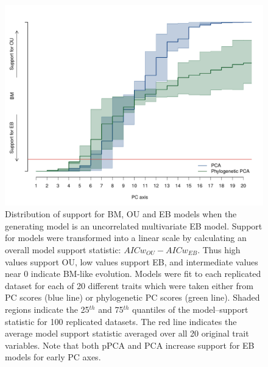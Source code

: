 \documentclass[12pt,twoside]{article}
\begin{document}
\begin{figure}[p]
\centering
\includegraphics[scale=0.65]{./fig/uncor-eb-aic.pdf}
\caption[Model support when generating model is uncorrelated EB]{Distribution of support for BM, OU and EB models when the generating model is an uncorrelated multivariate EB model. Support for models were transformed into a linear scale by calculating an overall model support statistic: $AICw_{OU} - AICw_{EB}$. Thus high values support OU, low values support EB, and intermediate values near 0 indicate BM-like evolution. Models were fit to each replicated dataset for each of 20 different traits which were taken either from PC scores (blue line) or phylogenetic PC scores (green line). Shaded regions indicate the 25$^{th}$ and 75$^{th}$ quantiles of the model--support statistic for 100 replicated datasets. The red  line indicates the average model support statistic averaged over all 20 original trait variables. Note that both pPCA and PCA increase support for EB models for early PC axes.}
\label{aicweb}
\end{figure}
\end{document}
